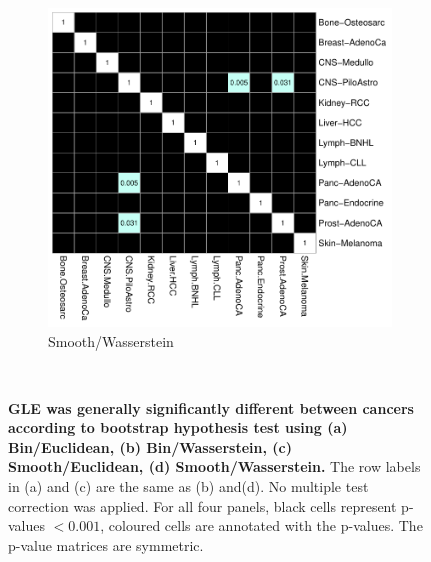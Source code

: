 \begin{figure}[ht!]
\begin{subfigure}{.55\textwidth}
    \includegraphics[scale=0.65]{graphics/bootstrap_smooth_wasserstein.pdf}
    \caption{Smooth/Wasserstein}
    \label{fig:smooth_wasserstein}
    \end{subfigure} \\
    \caption{\textbf{GLE was generally significantly different between cancers according to bootstrap hypothesis test using (a) Bin/Euclidean, (b) Bin/Wasserstein, (c) Smooth/Euclidean, (d) Smooth/Wasserstein.} The row labels in (a) and (c) are the same as (b) and(d). No multiple test correction was applied. For all four panels, black cells represent p-values $<0.001$, coloured cells are annotated with the p-values. The p-value matrices are symmetric.}
    \label{fig:gle_bootstrap}
\end{figure}